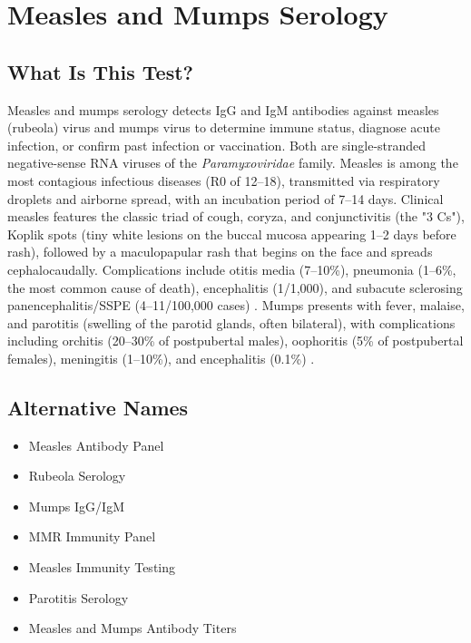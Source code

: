 \chapter{Measles and Mumps Serology}

\section*{What Is This Test?}
Measles and mumps serology detects IgG and IgM antibodies against measles (rubeola) virus and mumps virus to determine immune status, diagnose acute infection, or confirm past infection or vaccination. Both are single-stranded negative-sense RNA viruses of the \textit{Paramyxoviridae} family. Measles is among the most contagious infectious diseases (R0 of 12--18), transmitted via respiratory droplets and airborne spread, with an incubation period of 7--14 days. Clinical measles features the classic triad of cough, coryza, and conjunctivitis (the "3 Cs"), Koplik spots (tiny white lesions on the buccal mucosa appearing 1--2 days before rash), followed by a maculopapular rash that begins on the face and spreads cephalocaudally. Complications include otitis media (7--10\%), pneumonia (1--6\%, the most common cause of death), encephalitis (1/1,000), and subacute sclerosing panencephalitis/SSPE (4--11/100,000 cases) \cite{moss2017measles}. Mumps presents with fever, malaise, and parotitis (swelling of the parotid glands, often bilateral), with complications including orchitis (20--30\% of postpubertal males), oophoritis (5\% of postpubertal females), meningitis (1--10\%), and encephalitis (0.1\%) \cite{hviid2008mumps}.

\section*{Alternative Names}
\begin{itemize}
  \item Measles Antibody Panel
  \item Rubeola Serology
  \item Mumps IgG/IgM
  \item MMR Immunity Panel
  \item Measles Immunity Testing
  \item Parotitis Serology
  \item Measles and Mumps Antibody Titers
\end{itemize}

